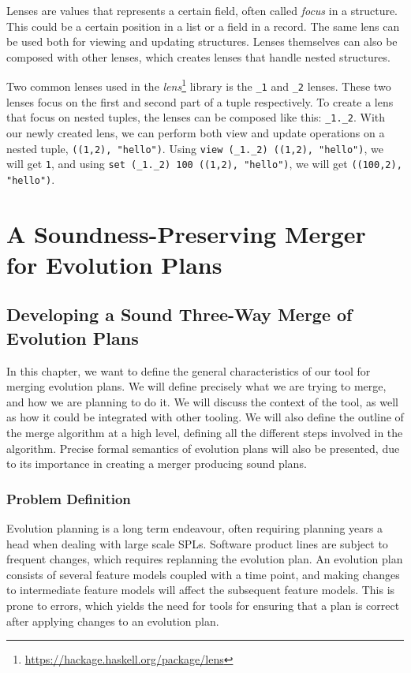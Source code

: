 \documentclass[a4paper,english]{ifimaster}
\begin{document}
Lenses are values that represents a certain field, often called \textit{focus} in a structure. This could be a certain position in a list or a field in a record. The same lens can be used both for viewing and updating structures. Lenses themselves can also be composed with other lenses, which creates lenses that handle nested structures.

Two common lenses used in the \textit{lens}\footnote{\url{https://hackage.haskell.org/package/lens}} library is the \texttt{\_1} and \texttt{\_2} lenses. These two lenses focus on the first and second part of a tuple respectively. To create a lens that focus on nested tuples, the lenses can be composed like this: \texttt{\_1.\_2}. With our newly created lens, we can perform both view and update operations on a nested tuple, \texttt{((1,2), "hello")}. Using \texttt{view (\_1.\_2) ((1,2), "hello")}, we will get \texttt{1}, and using \texttt{set (\_1.\_2) 100 ((1,2), "hello")}, we will get \texttt{((100,2), "hello")}.

\part{A Soundness-Preserving Merger for Evolution Plans}%
\label{prt:a_sound_semantic_merger_for_evolution_plans}

\chapter{Developing a Sound Three-Way Merge of Evolution Plans}%
\label{cha:developing_a_sound_three_way_merge_of_evolution_plans}

In this chapter, we want to define the general characteristics of our tool for merging evolution plans. We will define precisely what we are trying to merge, and how we are planning to do it. We will discuss the context of the tool, as well as how it could be integrated with other tooling. We will also define the outline of the merge algorithm at a high level, defining all the different steps involved in the algorithm. Precise formal semantics of evolution plans will also be presented, due to its importance in creating a merger producing sound plans.

\section{Problem Definition}%
\label{sec:problem_defintion}

Evolution planning is a long term endeavour, often requiring planning years a head when dealing with large scale SPLs. Software product lines are subject to frequent changes, which requires replanning the evolution plan. An evolution plan consists of several feature models coupled with a time point, and making changes to intermediate feature models will affect the subsequent feature models. This is prone to errors, which yields the need for tools for ensuring that a plan is correct after applying changes to an evolution plan.
\end{document}
